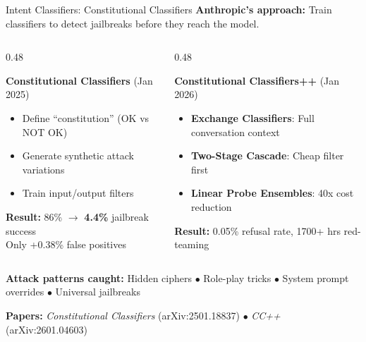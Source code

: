 \documentclass[aspectratio=169,9pt]{beamer}
\begin{document}
\begin{frame}{Intent Classifiers: Constitutional Classifiers}
\textbf{Anthropic's approach:} Train classifiers to detect jailbreaks before they reach the model.

\begin{columns}[T]
\begin{column}{0.48\textwidth}
\begin{bluebox}
\textbf{Constitutional Classifiers} {\scriptsize(Jan 2025)}\\[0.2em]
\scriptsize
\begin{itemize}
  \item Define ``constitution'' (OK vs NOT OK)
  \item Generate synthetic attack variations
  \item Train input/output filters
\end{itemize}
\textbf{Result:} 86\% $\rightarrow$ \textcolor{partgreen}{\textbf{4.4\%}} jailbreak success\\
Only +0.38\% false positives
\end{bluebox}
\end{column}

\begin{column}{0.48\textwidth}
\begin{greenbox}
\textbf{Constitutional Classifiers++} {\scriptsize(Jan 2026)}\\[0.2em]
\scriptsize
\begin{itemize}
  \item \textbf{Exchange Classifiers}: Full conversation context
  \item \textbf{Two-Stage Cascade}: Cheap filter first
  \item \textbf{Linear Probe Ensembles}: 40x cost reduction
\end{itemize}
\textbf{Result:} 0.05\% refusal rate, 1700+ hrs red-teaming
\end{greenbox}
\end{column}
\end{columns}

\vspace{0.3em}
\scriptsize
\textbf{Attack patterns caught:} Hidden ciphers $\bullet$ Role-play tricks $\bullet$ System prompt overrides $\bullet$ Universal jailbreaks

\begin{graybox}
\scriptsize\textbf{Papers:} \textit{Constitutional Classifiers} (arXiv:2501.18837) $\bullet$ \textit{CC++} (arXiv:2601.04603)
\end{graybox}
\end{frame}
\end{document}
